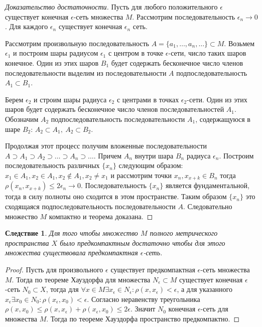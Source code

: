 \documentclass[14pt,a4paper]{extarticle}
\newtheorem{corollary}{Следствие}[theorem]
\theoremstyle{definition}
\theoremstyle{remark}
\renewcommand{\[}{\begin{dmath*}[compact]}
\renewcommand{\]}{\end{dmath*}}
\newcommand{\sep}{ , \ \allowbreak }
\begin{document}
\begin{proof}[Доказательство достаточности]
  Пусть для любого положительного $\epsilon$ существует конечная
  $\epsilon$-сеть множества $M$.
  Рассмотрим последовательность $\epsilon_n \to 0$.
  Для каждого $\epsilon_n$ существует конечная $\epsilon_n$ сеть.

  Рассмотрим произвольную последовательность
   $A=\{a_{1},\dots,a_n,\dots\}\subset M$.
  Возьмем $\epsilon_1$ и построим шары радиусом $\epsilon_1$
  с центром в точке $\epsilon$-сети, число таких шаров конечное.
  Один из этих шаров $B_1$ будет содержать бесконечное число членов
  последовательности выделим из последовательности $A$ подпоследовательность
  $A_1\subset B_1$.

  Берем $\epsilon_2$ и строим шары радиуса $\epsilon_2$ с центрами в точках
  $\epsilon_2$-сети.
  Один из этих шаров будет содержать бесконечное число членов
  последовательностей $A_1$. Обозначим $A_2$ подпоследовательность
  последовательности $A_1$, содержащуюся в шаре $B_2$:
  $A_2\subset A_1\sep A_2\subset B_2$.

  Продолжая этот процесс получим вложенные последовательности
  $A\supset A_1\supset A_2\supset \dots\supset A_n\supset \dots$.
  Причем $A_n$ внутри шара $B_n$ радиуса $\epsilon_n$.
  Построим последовательность различных $\{x_n\}$ следующим образом:
  $x_1 \in A_1, x_2 \in A_1, x_2 \not\in A_1, x_2 \neq x_1$ и рассмотрим точки
  $x_n, x_{x+k} \in B_n$ тогда $\rho(x_n,x_{x+k})\leq 2 \epsilon_n \to 0$.
  Последовательность $\{x_n\}$ является фундаментальной, тогда в силу полноты
  оно сходится в этом пространстве.
  Таким образом $\{x_n\}$ это сходящаяся подпоследовательность
  последовательности $A$.
  Следовательно множество $M$ компактно и теорема доказана.
\end{proof}

\begin{corollary}
  Для того чтобы множество $M$ полного метрического пространства $X$
  было предкомпактным достаточно чтобы для этого множества
  существовала предкомпактная $\epsilon$-сеть.
\end{corollary}

\begin{proof}
  Пусть для произвольного $\epsilon$ существует предкомпактная $\epsilon$-сеть
  множества $M$.
  Тогда по теореме Хауздорфа для множества $N_\epsilon \subset M$
  существует конечная $\epsilon$-сеть $N_0 \subset X$, тогда для
  $\forall x \in M \exists x_\epsilon \in N_\epsilon:
  \rho(x,x_\epsilon) < \epsilon$, а для указанного
  $x_\epsilon \exists x_0\in N_0: \rho(x_\epsilon,x_0)<\epsilon$.
  Согласно неравенству треугольника
  $\rho(x,x_0)\leq \rho(x,x_\epsilon) + \rho(x_\epsilon,x_0) \leq 2\epsilon$.
  Значит $N_0$ конечная $\epsilon$-сеть для множества $M$.
  Тогда по теореме Хауздорфа пространство предкомпактно.
\end{proof}
\end{document}
